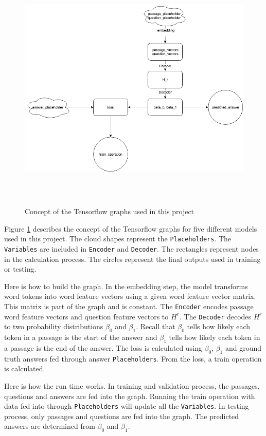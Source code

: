 \documentclass[modernstyle,12pt]{sjsuthesis}
\theoremstyle{definition}
\begin{document}
\begin{figure}[htbp]\centering
  \includegraphics[width=12cm, height=12cm]{figures/tf_graph.png}
  \caption{Concept of the Tensorflow graphs used in this project}
  \label{f:tf_graph}
\end{figure}

Figure \ref{f:tf_graph} describes the concept of the Tensorflow graphs for five different models used in this project. The cloud shapes represent the {\tt Placeholders}. The {\tt Variables} are included in {\tt Encoder} and {\tt Decoder}. The rectangles represent nodes in the calculation process. The circles represent the final outputs used in training or testing.

Here is how to build the graph. In the embedding step, the model transforms word tokens into word feature vectors using a given word feature vector matrix. This matrix is part of the graph and is constant. The {\tt Encoder} encodes passage word feature vectors and question feature vectors to $H^r$. The {\tt Decoder} decodes $H^r$ to two probability distributions $\beta _0$ and $\beta _1$. Recall that $\beta _0$ tells how likely each token in a passage is the start of the answer and $\beta _1$ tells how likely each token in a passage is the end of the answer. The loss is calculated using $\beta _0$, $\beta _1$ and ground truth answers fed through answer {\tt Placeholders}. From the loss, a train operation is calculated.

Here is how the run time works. In training and validation process, the passages, questions and answers are fed into the graph. Running the train operation with data fed into through {\tt Placeholders} will update all the {\tt Variables}. In testing process, only passages and questions are fed into the graph. The predicted answers are determined from $\beta _0$ and $\beta _1$.
\end{document}
